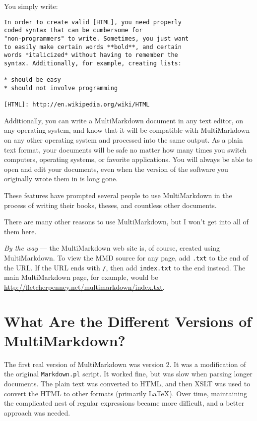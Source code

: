 You simply write:

\begin{verbatim}
In order to create valid [HTML], you need properly
coded syntax that can be cumbersome for 
"non-programmers" to write. Sometimes, you just want
to easily make certain words **bold**, and certain 
words *italicized* without having to remember the 
syntax. Additionally, for example, creating lists:

* should be easy
* should not involve programming

[HTML]: http://en.wikipedia.org/wiki/HTML
\end{verbatim}

Additionally, you can write a MultiMarkdown document in any text editor, on any operating system, and know that it will be compatible with MultiMarkdown on any other operating system and processed into the same output. As a plain text format, your documents will be safe no matter how many times you switch computers, operating systems, or favorite applications. You will always be able to open and edit your documents, even when the version of the software you originally wrote them in is long gone.

These features have prompted several people to use MultiMarkdown in the process of writing their books, theses, and countless other documents.

There are many other reasons to use MultiMarkdown, but I won't get into all of them here.

\emph{By the way} --- the MultiMarkdown web site is, of course, created using MultiMarkdown. To view the \gls{MMD} source for any page, add \texttt{.txt} to the end of the URL. If the URL ends with \texttt{\slash }, then add \texttt{index.txt} to the end instead. The main MultiMarkdown page, for example, would be \href{http://fletcherpenney.net/multimarkdown/index.txt}{http:\slash \slash fletcherpenney.net\slash multimarkdown\slash index.txt}.

\section{What Are the Different Versions of MultiMarkdown? }
\label{whatarethedifferentversionsofmultimarkdown}

The first real version of MultiMarkdown was version 2. It was a modification of the original \texttt{Markdown.pl} script. It worked fine, but was slow when parsing longer documents. The plain text was converted to HTML, and then XSLT was used to convert the HTML to other formats (primarily LaTeX). Over time, maintaining the complicated nest of regular expressions became more difficult, and a better approach was needed.

